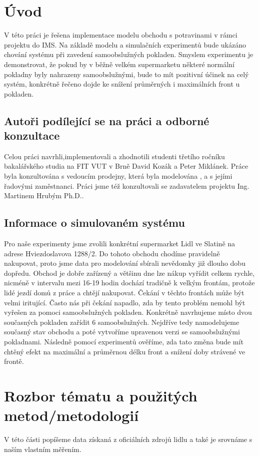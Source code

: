 \documentclass[12pt,a4paper]{report}
\begin{document}
\chapter{Úvod}
V této práci je řešena implementace modelu obchodu s potravinami v rámci projektu do IMS.
Na základě modelu a simulačních experimentů bude ukázáno chování systému při zavedení samoobslužných pokladen. Smyslem experimentu je demonstrovat, že pokud by v běžně velkém supermarketu některé normální pokladny byly nahrazeny samoobslužnými, bude to mít pozitivní účinek na celý systém, konkrétně řečeno dojde ke snížení průměrných i maximálních front u pokladen.
\section{Autoři podílející se na práci a odborné konzultace}
Celou práci navrhli,implementovali a zhodnotili studenti třetího ročníku bakalářského studia na FIT VUT v Brně David Kozák a Peter Miklánek. Práce byla konzultována s vedoucím prodejny, která byla modelována , a s jejími řadovými zaměstnanci.  Práci jsme též konzultovali se zadavatelem projektu Ing. Martinem Hrubým Ph.D..
\section{Informace o simulovaném systému}
Pro naše experimenty jsme zvolili konkrétní supermarket Lidl ve Slatině na adrese Hviezdoslavova 1288/2. Do tohoto obchodu chodíme pravidelně nakupovat, proto jsme data pro modelování sbírali nevědomky již dlouho dobu dopředu. Obchod je dobře zařízený a většinu dne lze nákup vyřídit celkem rychle, nicméně v intervalu mezi 16-19 hodin dochází tradičně k velkým frontám, protože lidé jezdí domů z práce a chtějí nakupovat. Čekání v těchto frontách může být velmi iritující. Často nás při čekání napadlo, zda by tento problém nemohl být vyřešen za pomoci samoobslužných pokladen. Konkrétně navrhujeme místo dvou současných pokladen zařídit 6 samoobslužných. Nejdříve tedy namodelujeme současný stav obchodu a poté vytvoříme upravenou verzi se samoobslužnými pokladnami. Následně pomocí experimentů ověříme, zda tato změna bude mít chtěný efekt na maximální a průměrnou délku front a snížení doby strávené ve frontě.
\chapter{Rozbor tématu a použitých metod/metodologií}
V této části popíšeme data získaná z oficiálních zdrojů lidlu a také je srovnáme s naším vlastním měřením.
\end{document}

